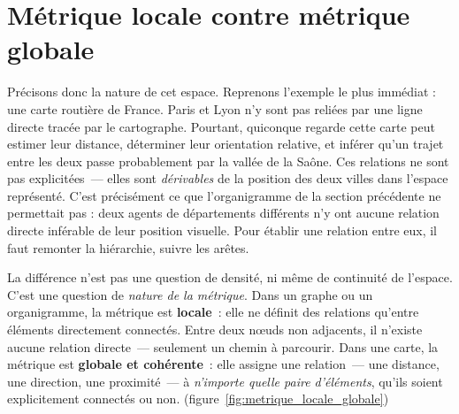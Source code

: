 \section{Métrique locale contre métrique globale}

Précisons donc la nature de cet espace. Reprenons l'exemple le plus immédiat :
une carte routière de France. Paris et Lyon n'y sont pas reliées par une ligne directe
tracée par le cartographe. Pourtant, quiconque regarde cette carte peut estimer leur
distance, déterminer leur orientation relative, et inférer qu'un trajet entre les
deux passe probablement par la vallée de la Saône. Ces relations ne sont pas
explicitées~--- elles sont \emph{dérivables} de la position des deux villes dans
l'espace représenté. C'est précisément ce que l'organigramme de la section
précédente ne permettait pas : deux agents de départements différents n'y ont
aucune relation directe inférable de leur position visuelle. Pour établir une relation
entre eux, il faut remonter la hiérarchie, suivre les arêtes.

La différence n'est pas une question de densité, ni même de continuité de l'espace.
C'est une question de \emph{nature de la métrique}. Dans un graphe ou un organigramme,
la métrique est \textbf{locale}~: elle ne définit des relations qu'entre éléments
directement connectés. Entre deux nœuds non adjacents, il n'existe aucune relation
directe~--- seulement un chemin à parcourir. Dans une carte, la métrique est \textbf{globale
et cohérente}~: elle assigne une relation~--- une distance, une direction, une
proximité~--- à \emph{n'importe quelle paire d'éléments}, qu'ils soient
explicitement connectés ou non. (figure~\ref{fig:metrique_locale_globale})

